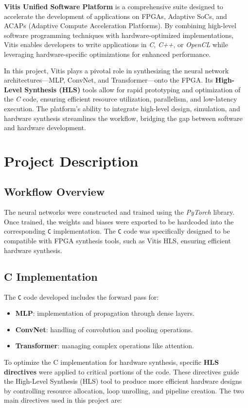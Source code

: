 \documentclass{article}
\begin{document}
\textbf{Vitis Unified Software Platform} is a comprehensive suite designed to accelerate the development of applications on FPGAs, Adaptive SoCs, and ACAPs (Adaptive Compute Acceleration Platforms). By combining high-level software programming techniques with hardware-optimized implementations, Vitis enables developers to write applications in \textit{C}, \textit{C++}, or \textit{OpenCL} while leveraging hardware-specific optimizations for enhanced performance.  

In this project, Vitis plays a pivotal role in synthesizing the neural network architectures—MLP, ConvNet, and Transformer—onto the FPGA. Its \textbf{High-Level Synthesis (HLS)} tools allow for rapid prototyping and optimization of the \textit{C} code, ensuring efficient resource utilization, parallelism, and low-latency execution. The platform's ability to integrate high-level design, simulation, and hardware synthesis streamlines the workflow, bridging the gap between software and hardware development.


\section{Project Description}
\subsection{Workflow Overview}
The neural networks were constructed and trained using the \textit{PyTorch} library. Once trained, the weights and biases were exported to be hardcoded into the corresponding \texttt{C} implementation. The \texttt{C} code was specifically designed to be compatible with FPGA synthesis tools, such as Vitis HLS, ensuring efficient hardware synthesis.


\subsection{C Implementation}
The \texttt{C} code developed includes the forward pass for:
\begin{itemize}
    \item \textbf{MLP}: implementation of propagation through dense layers.
    \item \textbf{ConvNet}: handling of convolution and pooling operations.
    \item \textbf{Transformer}: managing complex operations like attention.
\end{itemize}

To optimize the C implementation for hardware synthesis, specific \textbf{HLS directives} were applied to critical portions of the code. These directives guide the High-Level Synthesis (HLS) tool to produce more efficient hardware designs by controlling resource allocation, loop unrolling, and pipeline creation. The two main directives used in this project are:
\end{document}
